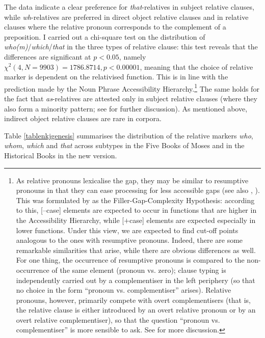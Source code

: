 \begin{sloppypar}
The data indicate a clear preference for \textit{that}-relatives in subject relative clauses, while \textit{wh}-relatives are preferred in direct object relative clauses and in relative clauses where the relative pronoun corresponds to the complement of a preposition. I carried out a chi-square test on the distribution of \textit{who(m)}/\textit{which}/\textit{that} in the three types of relative clause: this test reveals that the differences are significant at $p<0.05$, namely $\chi^2 (4, N = 9903) = 1786.8714,\allowbreak p < 0.00001$, meaning that the choice of relative marker is dependent on the relativised function. This is in line with the prediction made by the Noun Phrase Accessibility Hierarchy.\footnote{As relative pronouns lexicalise the gap, they may be similar to resumptive pronouns in that they can ease processing for less accessible gaps (see also \citealt[440]{romaine1984}, \citealt[230]{fleischer2004}). This was formulated by \citet[252--258]{hawkins1999} as the Filler-Gap-Complexity Hypothesis: according to this, [--case] elements are expected to occur in functions that are higher in the Accessibility Hierarchy, while [$+$case] elements are expected especially in lower functions. Under this view, we are expected to find cut-off points analogous to the ones with resumptive pronouns. Indeed, there are some remarkable similarities that arise, while there are obvious differences as well. For one thing, the occurrence of resumptive pronouns is compared to the non-occurrence of the same element (pronoun vs. zero); clause typing is independently carried out by a complementiser in the left periphery (so that no choice in the form ``pronoun vs. complementiser'' arises). Relative pronouns, however, primarily compete with overt complementisers (that is, the relative clause is either introduced by an overt relative pronoun or by an overt relative complementiser), so that the question ``pronoun vs. complementiser'' is more sensible to ask. See \citet[107]{bacskaiatkari2020nordlyd} for more discussion.} The same holds for the fact that \textit{as}-relatives are attested only in subject relative clauses (where they also form a minority pattern; see  for further discussion). As mentioned above, indirect object relative clauses are rare in corpora.
\end{sloppypar}

\begin{sloppypar}
Table \ref{tablenkjgenesis} summarises the distribution of the relative markers \textit{who}, \textit{whom}, \textit{which} and \textit{that} across subtypes in the Five Books of Moses and in the Historical Books in the new version.
\end{sloppypar}

